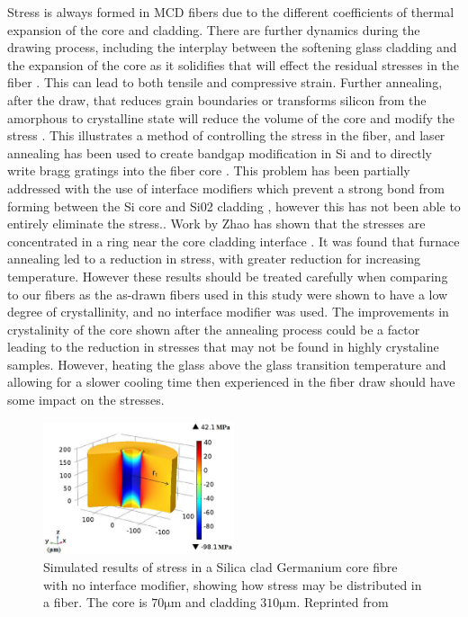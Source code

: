 Stress is always formed in MCD fibers due to the different coefficients of thermal expansion of the core and cladding. There are further dynamics during the drawing process, including the interplay between the softening glass cladding and the expansion of the core as it solidifies that will effect the residual stresses in the fiber \cite{Healy2018AFibres}. This can lead to both tensile and compressive strain. Further annealing, after the draw, that reduces grain boundaries or transforms silicon from the amorphous to crystalline state will reduce the volume of the core and modify the stress \cite{Zhao2017EffectFibre}. This illustrates a method of controlling the stress in the fiber, and laser annealing has been used to create bandgap modification in Si \cite{Healy2014ExtremeFibres} and to directly write bragg gratings into the fiber core \cite{Fokine2017LaserFibers}. This problem has been partially addressed with the use of interface modifiers which prevent a strong bond from forming between the Si core and Si02 cladding \cite{Gibson2013AlkalineFibers}, however this has not been able to entirely eliminate the stress.. 
 Work by Zhao has shown that the stresses are concentrated in a ring near the core cladding interface \cite{Zhao2018EffectsFiber}. It was found that furnace annealing led to a reduction in stress, with greater reduction for increasing temperature. However these results should be treated carefully when comparing to our fibers as the as-drawn fibers used in this study were shown to have a low degree of crystallinity, and no interface modifier was used. The improvements in crystalinity of the core shown after the annealing process could be a factor leading to the reduction in stresses that may not be found in highly crystaline samples. However, heating the glass above the glass transition temperature and allowing for a slower cooling time then experienced in the fiber draw should have some impact on the stresses.

\begin{figure}[h]
    \centering
    \includegraphics[width=0.5\textwidth]{fig/polishing/stress_simulation.png}
    \caption{Simulated results of stress in a Silica clad Germanium core fibre with no interface modifier, showing how stress may be distributed in a fiber. The core is $70\si{\micro\meter}$ and cladding $310\si{\micro\meter}$. Reprinted from \cite{Zhao2017EffectFiber}}
    \label{fig:my_label}
\end{figure}



